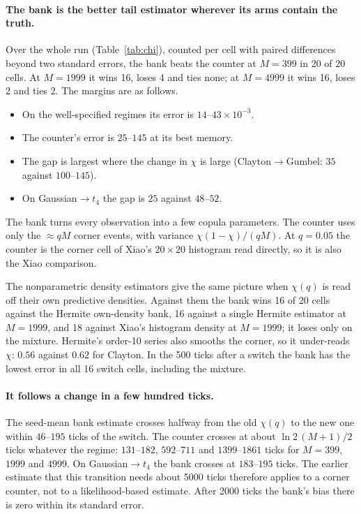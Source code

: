 \paragraph{The bank is the better tail estimator wherever its arms contain the truth.} Over the
whole run (Table~\ref{tab:chi}), counted per cell with paired differences beyond two standard
errors, the bank beats the counter at $M=399$ in 20 of 20 cells. At $M=1999$ it wins 16, loses 4 and
ties none; at $M=4999$ it wins 16, loses 2 and ties 2. The margins are as follows.
\begin{itemize}
  \item On the well-specified regimes its error is $14$--$43\times10^{-3}$.
  \item The counter's error is $25$--$145$ at its best memory.
  \item The gap is largest where the change in $\chi$ is large (Clayton$\to$Gumbel: $35$ against
    $100$--$145$).
  \item On Gaussian$\to t_4$ the gap is $25$ against $48$--$52$.
\end{itemize}
The bank turns every observation into a few copula parameters. The counter uses only the
$\approx qM$ corner events, with variance $\chi(1-\chi)/(qM)$. At $q=0.05$ the counter is the corner
cell of Xiao's $20\times20$ histogram read directly, so it is also the Xiao comparison.

The nonparametric density estimators give the same picture when $\chi(q)$ is read off their own
predictive densities. Against them the bank wins 16 of 20 cells against the Hermite own-density bank,
16 against a single Hermite estimator at $M=1999$, and 18 against Xiao's histogram density at
$M=1999$; it loses only on the mixture. Hermite's order-10 series also smooths the corner, so it
under-reads $\chi$: $0.56$ against $0.62$ for Clayton. In the 500 ticks after a switch the
bank has the lowest error in all 16 switch cells, including the mixture.

\paragraph{It follows a change in a few hundred ticks.} The seed-mean bank estimate crosses halfway
from the old $\chi(q)$ to the new one within $46$--$195$ ticks of the switch. The counter crosses at
about $\ln2\,(M+1)/2$ ticks whatever the regime: $131$--$182$, $592$--$711$ and $1399$--$1861$ ticks
for $M=399$, $1999$ and $4999$. On Gaussian$\to t_4$ the bank crosses at $183$--$195$ ticks. The
earlier estimate that this transition needs about 5000 ticks therefore applies to a corner counter,
not to a likelihood-based estimate. After 2000 ticks the bank's bias there is zero within its
standard error.

